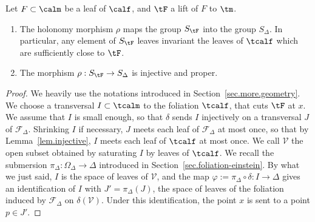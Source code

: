 \begin{lemm}\label{lem.holonomy}
Let $F \subset \calm$ be a leaf of $\calf$, and $\tF$ a lift of $F$ to $\tm$.
\begin{enumerate}
\item \label{8.14.1}The holonomy morphism $\rho$ maps the group ${S}_{\tF}$ into the group $S_{\Delta}$. In particular, any element of $S_{\tF}$ leaves invariant the leaves of $\tcalf$ which are sufficiently close to $\tF$.
\item \label{8.14.2}The morphism $\rho : S_{\tF} \to S_{\Delta}$ is injective and proper.
\end{enumerate}
\end{lemm}

\begin{proof}
We heavily use the notations introduced in Section~\ref{sec.more.geometry}. We choose a transversal $I \subset \tcalm$ to the foliation $\tcalf$, that cuts $\tF$ at $x$. We assume that $I$ is small enough, so that $\delta$ sends $I$ injectively on a transversal $J$ of ${\mathcal F}_{\Delta}$. Shrinking $I$ if necessary, $J$ meets each leaf of ${\mathcal F}_{\Delta}$ at most once, so that by Lemma~\ref{lem.injective}, $I$ meets each leaf of $\tcalf$ at most once. We call $\mathcal{V}$ the open subset obtained by saturating $I$ by leaves of $\tcalf$. We recall the submersion $\pi_{\Delta}: \Omega_{\Delta} \to \Delta$ introduced in Section~\ref{sec.foliation-einstein}. By what we just said, $I$ is the space of leaves of $\mathcal{V}$, and the map $\varphi:=\pi_{\Delta} \circ \delta: I \to \Delta$ gives an identification of $I$ with $J'=\pi_{\Delta}(J)$, the space of leaves of the foliation induced by ${\mathcal F}_{\Delta}$ on $\delta({\mathcal V})$. Under this identification, the point $x$ is sent to a point $p \in J'$.


\end{proof}
